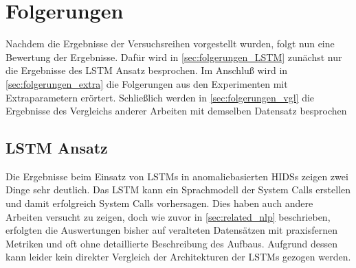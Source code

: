 \chapter{Folgerungen}\label{ch:folgerungen}
Nachdem die Ergebnisse der Versuchsreihen vorgestellt wurden, folgt nun eine Bewertung der Ergebnisse.
Dafür wird in \autoref{sec:folgerungen_LSTM} zunächst nur die Ergebnisse des \ac{LSTM} Ansatz besprochen.
Im Anschluß wird in \autoref{sec:folgerungen_extra} die Folgerungen aus den Experimenten mit Extraparametern erörtert. 
Schließlich werden in \autoref{sec:folgerungen_vgl} die Ergebnisse des Vergleichs anderer Arbeiten mit demselben Datensatz besprochen

\section{LSTM Ansatz}\label{sec:folgerungen_LSTM}

Die Ergebnisse beim Einsatz von \acp{LSTM} in anomaliebasierten \acp{HIDS} zeigen zwei Dinge sehr deutlich.
Das \ac{LSTM} kann ein Sprachmodell der System Calls erstellen und damit erfolgreich System Calls vorhersagen.
Dies haben auch andere Arbeiten versucht zu zeigen, doch wie zuvor in \autoref{sec:related_nlp} beschrieben, erfolgten die Auswertungen bisher auf veralteten Datensätzen mit praxisfernen Metriken und oft ohne detaillierte Beschreibung des Aufbaus.
Aufgrund dessen kann leider kein direkter Vergleich der Architekturen der \acp{LSTM} gezogen werden.

